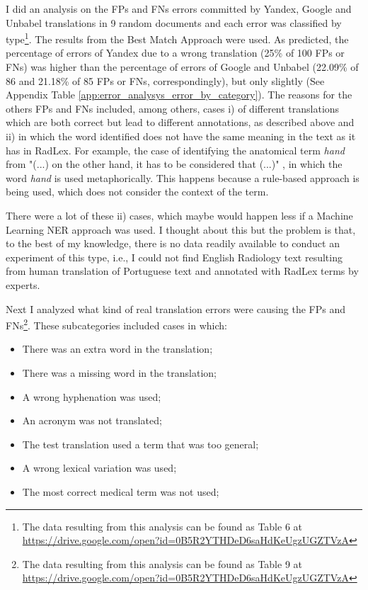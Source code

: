 I did an analysis on the FPs and FNs errors committed by Yandex, Google and Unbabel translations in 9 random documents and each error was classified by type\footnote{The data resulting from this analysis can be found as Table 6 at \url{https://drive.google.com/open?id=0B5R2YTHDeD6saHdKeUgzUGZTVzA}}. The results from the Best Match Approach were used. As predicted, the percentage of errors of Yandex due to a wrong translation (25\% of 100 FPs or FNs) was higher than the percentage of errors of Google and Unbabel (22.09\% of 86 and 21.18\% of 85 FPs or FNs, correspondingly), but only slightly (See Appendix Table \ref{app:error_analysys_error_by_category}). The reasons for the others FPs and FNs included, among others, cases i) of different translations which are both correct but lead to different annotations, as described above and ii) in which the word identified does not have the same meaning in the text as it has in RadLex. For example, the case of identifying the anatomical term \textit{hand} from "(...) on the other hand, it has to be considered that (...)" , in which the word \textit{hand} is used metaphorically. This happens because a rule-based approach is being used, which does not consider the context of the term. 

There were a lot of these ii) cases, which maybe would happen less if a Machine Learning NER approach was used. I thought about this but the problem is that, to the best of my knowledge, there is no data  readily available to conduct an experiment of this type, i.e., I could not find English Radiology text resulting from human translation of Portuguese text and annotated with RadLex terms by experts. 

Next I analyzed what kind of real translation errors were causing the FPs and FNs\footnote{The data resulting from this analysis can be found as Table 9 at \url{https://drive.google.com/open?id=0B5R2YTHDeD6saHdKeUgzUGZTVzA}}. These subcategories included cases in which:

\begin{itemize}
	\item There was an extra word in the translation;
	\item There was a missing word in the translation;
	\item A wrong hyphenation was used;
	\item An acronym was not translated; 
	\item The test translation used a term that was too general;
	\item A wrong lexical variation was used;
	\item The most correct medical term was not used;
\end{itemize}

